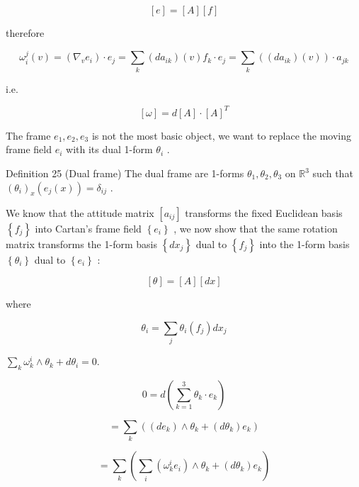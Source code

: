 \documentclass[lang=cn,a4paper,11pt,openany,twoside]{elegantbook}
\begin{document}
\[
\left\lbrack  e\right\rbrack   = \left\lbrack  A\right\rbrack  \left\lbrack  f\right\rbrack
\]

therefore

\[
{\omega }_{i}^{j}\left( v\right)  = \left( {{\nabla }_{v}{e}_{i}}\right)  \cdot  {e}_{j} = \mathop{\sum }\limits_{k}\left( {d{a}_{ik}}\right) \left( v\right) {f}_{k} \cdot  {e}_{j} = \mathop{\sum }\limits_{k}\left( {\left( {d{a}_{ik}}\right) \left( v\right) }\right)  \cdot  {a}_{jk}
\]

i.e.

\[
\left\lbrack  \omega \right\rbrack   = d\left\lbrack  A\right\rbrack   \cdot  {\left\lbrack  A\right\rbrack  }^{T}
\]

The frame \({e}_{1},{e}_{2},{e}_{3}\) is not the most basic object, we want to replace the moving frame field \({e}_{i}\) with its dual 1-form \({\theta }_{i}\) .

Definition 25 (Dual frame) The dual frame are 1-forms \({\theta }_{1},{\theta }_{2},{\theta }_{3}\) on \({\mathbb{R}}^{3}\) such that \({\left( {\theta }_{i}\right) }_{x}\left( {{e}_{j}\left( x\right) }\right)  = {\delta }_{ij}\) .

We know that the attitude matrix \(\left\lbrack  {a}_{ij}\right\rbrack\) transforms the fixed Euclidean basis \(\left\{  {f}_{j}\right\}\) into Cartan’s frame field \(\left\{  {e}_{i}\right\}\) , we now show that the same rotation matrix transforms the 1-form basis \(\left\{  {d{x}_{j}}\right\}\) dual to \(\left\{  {f}_{j}\right\}\) into the 1-form basis \(\left\{  {\theta }_{i}\right\}\) dual to \(\left\{  {e}_{i}\right\}\) :

\[
\left\lbrack  \theta \right\rbrack   = \left\lbrack  A\right\rbrack  \left\lbrack  {dx}\right\rbrack
\]

where

\[
{\theta }_{i} = \mathop{\sum }\limits_{j}{\theta }_{i}\left( {f}_{j}\right) d{x}_{j}
\]

\(\mathop{\sum }\limits_{k}{\omega }_{k}^{i} \land  {\theta }_{k} + d{\theta }_{i} = 0.\)

\[
0 = d\left( {\mathop{\sum }\limits_{{k = 1}}^{3}{\theta }_{k} \cdot  {e}_{k}}\right)
\]

\[
= \mathop{\sum }\limits_{k}\left( {\left( {d{e}_{k}}\right)  \land  {\theta }_{k} + \left( {d{\theta }_{k}}\right) {e}_{k}}\right)
\]

\[
= \mathop{\sum }\limits_{k}\left( {\mathop{\sum }\limits_{i}\left( {{\omega }_{k}^{i}{e}_{i}}\right)  \land  {\theta }_{k} + \left( {d{\theta }_{k}}\right) {e}_{k}}\right)
\]
\end{document}

